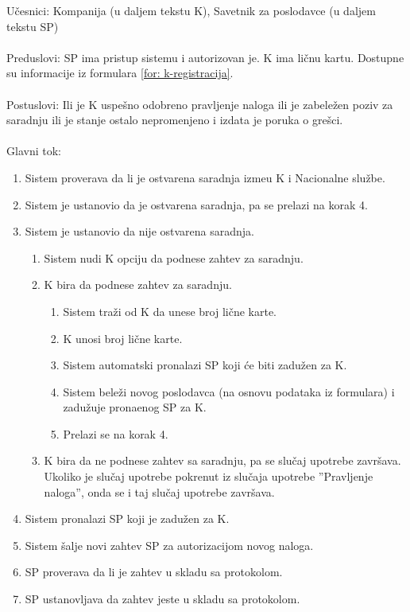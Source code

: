 \noindent U\v cesnici: Kompanija (u daljem tekstu K), Savetnik za poslodavce (u daljem tekstu SP)
\\
\\ Preduslovi: SP ima pristup sistemu i autorizovan je. K ima li\v cnu kartu. Dostupne su informacije iz formulara \ref{for: k-registracija}.
\\
\\ Postuslovi: Ili je K uspe\v sno odobreno pravljenje naloga ili je zabele\v zen poziv za saradnju ili je stanje ostalo nepromenjeno i izdata je poruka o gre\v sci.
\\ 
\\ Glavni tok:
\begin{enumerate}
	\item Sistem proverava da li je ostvarena saradnja izme\dj u K i Nacionalne slu\v zbe.
	\item Sistem je ustanovio da je ostvarena saradnja, pa se prelazi na korak 4.
	\item Sistem je ustanovio da nije ostvarena saradnja.
	\begin{enumerate}
		\item Sistem nudi K opciju da podnese zahtev za saradnju.
		\item K bira da podnese zahtev za saradnju.
		\begin{enumerate}
			\item Sistem tra\v zi od K da unese broj li\v cne karte.
			\item K unosi broj li\v cne karte.
			\item Sistem automatski pronalazi SP koji \' ce biti zadu\v zen za K.
			\item Sistem bele\v zi novog poslodavca (na osnovu podataka iz formulara) i zadu\v zuje prona\dj enog SP za K.
			\item Prelazi se na korak 4.
		\end{enumerate}
		\item K bira da ne podnese zahtev sa saradnju, pa se slu\v caj upotrebe zavr\v sava. Ukoliko je slu\v caj upotrebe pokrenut iz slu\v caja upotrebe ''Pravljenje naloga'', onda se i taj slu\v caj upotrebe zavr\v sava.
	\end{enumerate}
	\item Sistem pronalazi SP koji je zadu\v zen za K.
	\item Sistem \v salje novi zahtev SP za autorizacijom novog naloga.
	\item SP proverava da li je zahtev u skladu sa protokolom.
	\item SP ustanovljava da zahtev jeste u skladu sa protokolom.

\end{enumerate}
